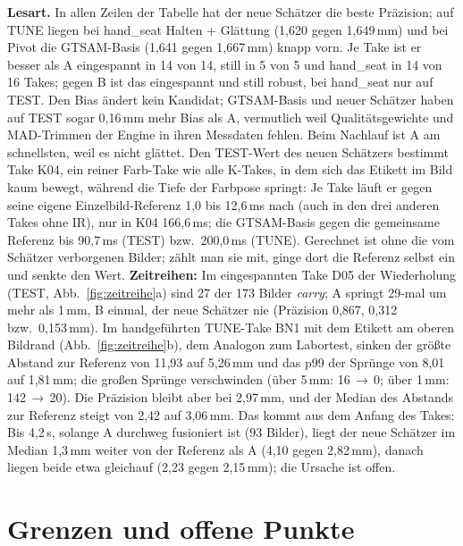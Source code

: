 \documentclass[11pt,a4paper,fleqn]{article}
\begin{document}
\textbf{Lesart.} In allen Zeilen der Tabelle hat der neue Schätzer die beste Präzision; auf TUNE liegen bei
hand\_seat Halten + Glättung (1,620 gegen 1,649\,mm) und bei Pivot die GTSAM-Basis (1,641 gegen 1,667\,mm) knapp
vorn. Je Take ist er besser als A eingespannt in 14 von 14, still in 5 von 5 und hand\_seat in 14 von 16 Takes;
gegen B ist das eingespannt und still robust, bei hand\_seat nur auf TEST. Den Bias ändert kein Kandidat;
GTSAM-Basis und neuer Schätzer haben auf TEST sogar 0,16\,mm mehr Bias als A, vermutlich weil Qualitätsgewichte
und MAD-Trimmen der Engine in ihren Messdaten fehlen. Beim Nachlauf ist A am schnellsten, weil es nicht glättet.
Den TEST-Wert des neuen Schätzers bestimmt Take K04, ein reiner Farb-Take wie alle K-Takes, in dem sich das
Etikett im Bild kaum bewegt, während die Tiefe der Farbpose springt: Je Take läuft er gegen seine eigene
Einzelbild-Referenz 1,0 bis 12,6\,ms nach (auch in den drei anderen Takes ohne IR), nur in K04 166,6\,ms; die
GTSAM-Basis gegen die gemeinsame Referenz bis 90,7\,ms (TEST) bzw.\ 200,0\,ms (TUNE). Gerechnet ist ohne die vom
Schätzer verborgenen Bilder; zählt man sie mit, ginge dort die Referenz selbst ein und senkte den Wert.
\textbf{Zeitreihen:} Im eingespannten Take D05 der Wiederholung (TEST, Abb.~\ref{fig:zeitreihe}a) sind 27 der 173 Bilder
\emph{carry}; A springt 29-mal um mehr als 1\,mm, B einmal, der neue Schätzer nie (Präzision 0,867, 0,312 bzw.\
0,153\,mm). Im handgeführten TUNE-Take BN1 mit dem Etikett am oberen Bildrand (Abb.~\ref{fig:zeitreihe}b), dem
Analogon zum Labortest, sinken der größte Abstand zur Referenz von 11,93 auf 5,26\,mm und das p99 der Sprünge von
8,01 auf 1,81\,mm; die großen Sprünge verschwinden (über 5\,mm: 16\,$\to$\,0; über 1\,mm: 142\,$\to$\,20). Die
Präzision bleibt aber bei 2,97\,mm, und der Median des Abstands zur Referenz steigt von 2,42 auf 3,06\,mm. Das
kommt aus dem Anfang des Takes: Bis 4,2\,s, solange A durchweg fusioniert ist (93 Bilder), liegt der neue Schätzer
im Median 1,3\,mm weiter von der Referenz als A (4,10 gegen 2,82\,mm), danach liegen beide etwa gleichauf (2,23
gegen 2,15\,mm); die Ursache ist offen.

\section{Grenzen und offene Punkte}
\label{sec:grenzen}
\end{document}
